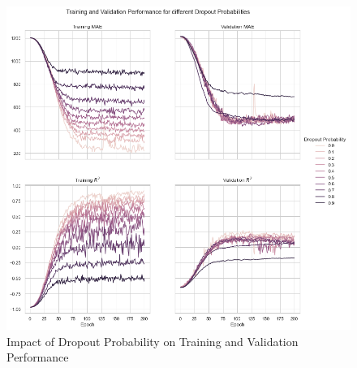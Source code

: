 \documentclass[12pt, letterpaper]{article}
\begin{document}
\begin{figure}[t]
    \centering
    \includegraphics[width=\textwidth]{dropout_performance.png}
    \caption{Impact of Dropout Probability on Training and Validation Performance}
    \label{fig:dropout}
\end{figure}
\end{document}
